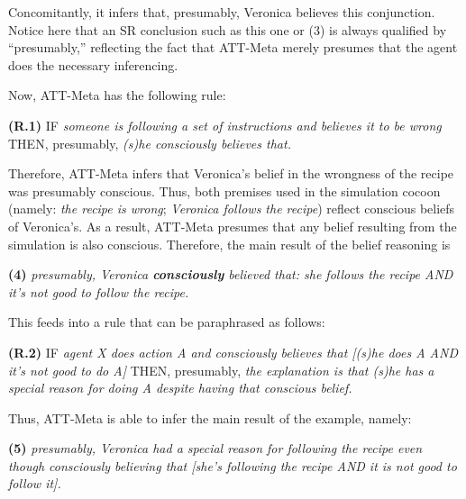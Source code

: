 Concomitantly, it infers that, presumably, Veronica believes this conjunction.
Notice here that an SR conclusion such as this one or (3) is always qualified by
``presumably,'' reflecting the fact that ATT-Meta merely presumes that the
agent does the necessary inferencing.

Now, ATT-Meta has the following  rule:

\addtolength{\baselineskip}{-.375\baselineskip}

{\bf (R.1)} IF {\it someone is following a set
of instructions and believes it to be wrong} THEN,
presumably, {\it (s)he {\it consciously} believes that.}
%

\addtolength{\baselineskip}{+.6\baselineskip}

\noindent 
Therefore, ATT-Meta infers that Veronica's belief in
the wrongness of the recipe was presumably conscious. Thus, both
premises used in the simulation cocoon (namely: {\it the recipe is wrong}; {\it
Veronica follows the recipe}) reflect conscious beliefs of Veronica's. As
a result, ATT-Meta presumes that any belief resulting from the simulation is
also conscious. Therefore, the main result of the belief reasoning  is

\addtolength{\baselineskip}{-.375\baselineskip}

{\bf (4)} {\it presumably, Veronica {\bf consciously} believed that: she follows the
recipe AND it's not  good to follow the recipe.}

\addtolength{\baselineskip}{+.6\baselineskip}

This feeds into a rule that can be paraphrased as follows:

\addtolength{\baselineskip}{-.375\baselineskip}

{\bf (R.2)} IF {\it agent X does action A and consciously believes that [(s)he does A AND
it's not good to do A]} THEN, presumably, {\it the explanation is that (s)he
has a special reason for doing A despite having that conscious belief.}

Thus, ATT-Meta is able to infer the main result of the example, namely:

{\bf (5)} {\it presumably, Veronica had a special reason for following the recipe even
though consciously believing that [she's following the recipe AND it is not
good to follow it].}

